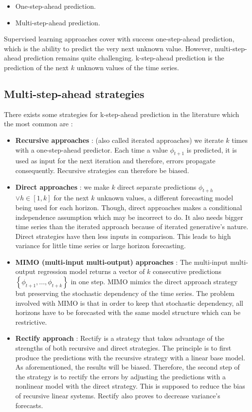 \documentclass[11pt,a4paper,oneside]{book}
\newenvironment{myitemize}
{ \begin{itemize}
    \setlength\itemsep{0pt}}
{ \end{itemize}                  }
\begin{document}
\begin{myitemize}
    \item One-step-ahead prediction.
    \item Multi-step-ahead prediction.
\end{myitemize}

Supervised learning approaches cover with success one-step-ahead prediction, which is the ability to predict the very next unknown value. However, multi-step-ahead prediction remains quite challenging.  k-step-ahead prediction is the prediction of the next $k$ unknown values of the time series. 

\subsection{Multi-step-ahead strategies}

There exists some strategies for k-step-ahead prediction in the literature which the most common are \cite{Bonte}\cite{taiebonte}:

\begin{itemize}
    \item \textbf{Recursive approaches} : (also called iterated approaches) we iterate $k$ times with a one-step-ahead predictor. Each time a value $\phi_{t+1}$ is predicted, it is used as input for the next iteration and therefore, errors propagate consequently. Recursive strategies can therefore be biased.
    \item \textbf{Direct approaches} : we make $k$ direct separate predictions $\phi_{t+h}$ $\vee h \in \left[1, k\right]$ for the next $k$ unknown values, a different forecasting model being used for each horizon. Though, direct approaches makes a conditional independence assumption which may be incorrect to do. It also needs bigger time series than the iterated approach because of iterated generative's nature. Direct strategies have then less inputs in comparison. This leads to high variance for little time series or large horizon forecasting.
    \item \textbf{MIMO (multi-input multi-output) approaches} : The multi-input multi-output regression model returns a vector of $k$ consecutive predictions $\left\{\phi_{t+1},...,\phi_{t+k}\right\}$ in one step. MIMO mimics the direct approach strategy but preserving the stochastic dependency of the time series. The problem involved with MIMO is that in order to keep that stochastic dependency, all horizons have to be forecasted with the same model structure which can be restrictive. \cite{Bonte}\cite{taiebonte}
    \item \textbf{Rectify approach} : Rectify is a strategy that takes advantage of the strengths of both recursive and direct strategies. The principle is to first produce the predictions with the recursive strategy with a linear base model. As aforementioned, the results will be biased. Therefore, the second step of the strategy is to rectify the errors by adjusting the predictions with a nonlinear model with the direct strategy. This is supposed to reduce the bias of recursive linear systems. Rectify also proves to decrease variance's forecasts. \cite{BenTaieb}
\end{itemize}
\end{document}
